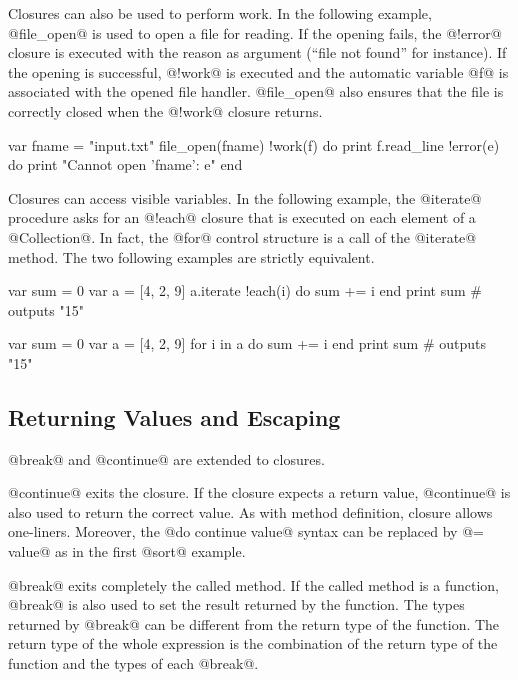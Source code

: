 Closures can also be used to perform work.
In the following example, @file_open@ is used to open a file for reading.
If the opening fails, the @!error@ closure is executed with the reason as argument (``file not found'' for instance).
If the opening is successful, @!work@ is executed and the automatic variable @f@ is associated with the opened file handler.
@file_open@ also ensures that the file is correctly closed when the @!work@ closure returns.

\begin{lst}
var fname = "input.txt"
file_open(fname) !work(f) do
	print f.read_line
!error(e) do
	print "Cannot open '{fname}': {e}"
end
\end{lst}


Closures can access visible variables.
In the following example, the @iterate@ procedure asks for an @!each@ closure that is executed on each element of a @Collection@.
In fact, the @for@ control structure is a call of the @iterate@ method.
The two following examples are strictly equivalent.

\begin{multicols}{2}
\begin{lst}
var sum = 0
var a = [4, 2, 9]
a.iterate !each(i) do
	sum += i
end
print sum # outputs "15"
\end{lst}
\columnbreak
\begin{lst}
var sum = 0
var a = [4, 2, 9]
for i in a do
	sum += i
end
print sum # outputs "15"
\end{lst}
\end{multicols}

\subsection{Returning Values and Escaping}\label{closure return}

@break@ and @continue@ are extended to closures.

@continue@ exits the closure.
If the closure expects a return value, @continue@ is also used to return the correct value.
As with method definition, closure allows one-liners.
Moreover, the @do continue value@ syntax can be replaced by @= value@ as in the first @sort@ example.


@break@ exits completely the called method.
If the called method is a function, @break@ is also used to set the result returned by the function.
The types returned by @break@ can be different from the return type of the function.
The return type of the whole expression is the combination of the return type of the function and the types of each @break@.

